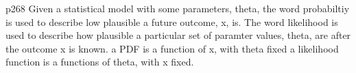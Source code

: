 p268
Given a statistical model with some parameters, theta, the word probabiltiy is used to describe low plausible a future outcome, x, is.
The word likelihood is used to describe how plausible a particular set of paramter values, theta, are after the outcome x is known.
a PDF is a function of x, with theta fixed
a likelihood function is a functions of theta, with x fixed.
















































































